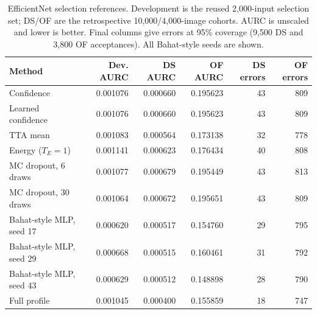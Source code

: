 \begin{table}[t]
\caption{EfficientNet selection references. Development is the reused 2,000-input selection set; DS/OF are the retrospective 10,000/4,000-image cohorts. AURC is unscaled and lower is better. Final columns give errors at 95\% coverage (9,500 DS and 3,800 OF acceptances). All Bahat-style seeds are shown.}
\label{tab:references}
\centering\small
\begin{tabular}{lrrrrr}
\toprule
Method & Dev. AURC & DS AURC & OF AURC & DS errors & OF errors \\
\midrule
Confidence & 0.001076 & 0.000660 & 0.195623 & 43 & 809 \\
Learned confidence & 0.001076 & 0.000660 & 0.195623 & 43 & 809 \\
TTA mean & 0.001083 & 0.000564 & 0.173138 & 32 & 778 \\
Energy ($T_E=1$) & 0.001141 & 0.000623 & 0.176434 & 40 & 808 \\
MC dropout, 6 draws & 0.001077 & 0.000679 & 0.195449 & 43 & 813 \\
MC dropout, 30 draws & 0.001064 & 0.000672 & 0.195651 & 43 & 809 \\
Bahat-style MLP, seed 17 & 0.000620 & 0.000517 & 0.154760 & 29 & 795 \\
Bahat-style MLP, seed 29 & 0.000668 & 0.000515 & 0.160461 & 31 & 792 \\
Bahat-style MLP, seed 43 & 0.000629 & 0.000512 & 0.148898 & 28 & 790 \\
Full profile & 0.001045 & 0.000400 & 0.155859 & 18 & 747 \\
\bottomrule
\end{tabular}
\end{table}

